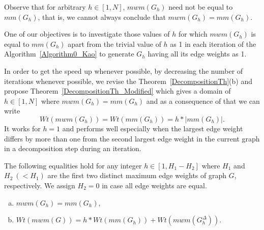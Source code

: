 \documentclass[runningheads,a4paper]{llncs}
\begin{document}
\begin{remark}
Observe that for arbitrary $h \in [1,N]$, $\textit{mwm}(G_h)$ need not be equal
to $\textit{mm}(G_h)$, that is, we cannot always conclude that $\textit{mwm}(G_h)=\textit{mm}(G_h)$.
\end{remark}

One of our objectives is to investigate those values of $h$ for which
$\textit{mwm}(G_h)$ is equal to $\textit{mm}(G_h)$ apart from
the trivial value of $h$
as 1 in each iteration of the Algorithm~\ref{Algorithm0_Kao} to generate $G_h$ having all its
edge weights as 1.

In order to get the speed up whenever possible, by decreasing the number of iterations whenever possible, we revise
the Theorem~\ref{DecompositionTh}(b) and propose Theorem~\ref{DecompositionTh_Modified} which gives a
domain of $h \in [1,N]$ where $\textit{mwm}(G_h)=\textit{mm}(G_h)$ and as a consequence of that 
we can write 
$$\textit{Wt}(\textit{mwm}(G_h))=\textit{Wt}(\textit{mm}(G_h))=h*|\textit{mm}(G_h)|.$$ 
It works for $h=1$
and performs well especially when the largest edge weight differs  by
more than one from the second largest edge weight in the current graph
in a decomposition step during an iteration.

\begin{theorem}
\label{DecompositionTh_Modified}
The following equalities hold for any integer $h \in [1,H_1-H_2]$ where
$H_1$ and $H_2 ~(<H_1)$ are the first two distinct maximum edge weights of graph
$G$, respectively. We assign $H_2 = 0$ in case all edge weights are
equal.
\begin{enumerate}[(a)]
\item \label{thm:dt:a} $\textit{mwm}(G_h)  = \textit{mm}(G_h)$,

\item
$\textit{Wt}(\textit{mwm}(G)) = h * \textit{Wt}(\textit{mm}(G_h))+ \textit{Wt}(\textit{mwm}(G_h^\Delta)).
$
\end{enumerate}
\end{theorem}
\end{document}
